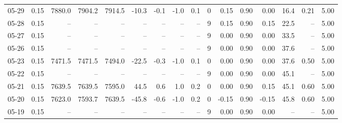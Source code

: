 \begin{threeparttable}
{\begin{tabular}{lrrrrrrrrrrrrrrr}
  05-29 &     0.15 & 7880.0 & 7904.2 & 7914.5 &      -10.3 &           -0.1 &                     -1.0 &                 0.1 &              0 &       0.15 &      0.90 &           0.00 &             16.4 &            0.21 &                   5.00 \\
  05-28 &     0.15 &     -- &     -- &     -- &         -- &             -- &                       -- &                  -- &              9 &       0.15 &      0.90 &           0.15 &             22.5 &              -- &                   5.00 \\
  05-27 &     0.15 &     -- &     -- &     -- &         -- &             -- &                       -- &                  -- &              9 &       0.00 &      0.90 &           0.00 &             33.5 &              -- &                   5.00 \\
  05-26 &     0.15 &     -- &     -- &     -- &         -- &             -- &                       -- &                  -- &              9 &       0.00 &      0.90 &           0.00 &             37.6 &              -- &                   5.00 \\
  05-23 &     0.15 & 7471.5 & 7471.5 & 7494.0 &      -22.5 &           -0.3 &                     -1.0 &                 0.1 &              0 &       0.00 &      0.90 &           0.00 &             37.6 &            0.50 &                   5.00 \\
  05-22 &     0.15 &     -- &     -- &     -- &         -- &             -- &                       -- &                  -- &              9 &       0.00 &      0.90 &           0.00 &             45.1 &              -- &                   5.00 \\
  05-21 &     0.15 & 7639.5 & 7639.5 & 7595.0 &       44.5 &            0.6 &                      1.0 &                 0.2 &              0 &       0.00 &      0.90 &           0.15 &             45.1 &            0.60 &                   5.00 \\
  05-20 &     0.15 & 7623.0 & 7593.7 & 7639.5 &      -45.8 &           -0.6 &                     -1.0 &                 0.2 &              0 &      -0.15 &      0.90 &          -0.15 &             45.8 &            0.60 &                   5.00 \\
  05-19 &     0.15 &     -- &     -- &     -- &         -- &             -- &                       -- &                  -- &              9 &       0.00 &      0.90 &           0.00 &               -- &              -- &                   5.00 \\

\end{tabular}}
\end{threeparttable}
